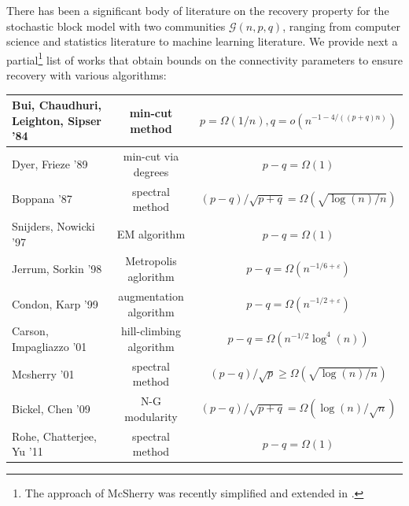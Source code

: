 \documentclass[english]{article}
\newcommand{\eps}{\varepsilon}
\newcommand{\1}{\textbf{1}}
\begin{document}
There has been a significant body of literature on the recovery property for the stochastic block model with two communities $\mathcal{G}(n,p,q)$, ranging from computer science and statistics literature to machine learning literature. We provide next a partial\footnote{The approach of McSherry was recently simplified and extended in \cite{Vu-arxiv}.} list of works that obtain bounds on the connectivity parameters to ensure recovery with various algorithms:
\begin{center}
  \begin{tabular}{| l |  c |c   | }
  \hline
\cite{bui} Bui, Chaudhuri, Leighton, Sipser '84  & min-cut method& $p = \Omega(1/n), q=o(n^{-1-4/((p+q)n)})$\\
  \hline
\cite{dyer} Dyer, Frieze '89  & min-cut via degrees & $p -q = \Omega(1)$\\
  \hline
\cite{boppana} Boppana '87  & spectral method & $(p -q)/\sqrt{p+q} = \Omega(\sqrt{\log(n)/n})$\\
  \hline
\cite{snij} Snijders, Nowicki '97  & EM algorithm & $p -q = \Omega(1)$\\
\hline
\cite{jerrum} Jerrum, Sorkin '98  &Metropolis aglorithm & $p -q= \Omega(n^{-1/6+\eps})$\\
   \hline
\cite{condon} Condon, Karp '99 & augmentation algorithm & $p -q= \Omega(n^{-1/2+\eps})$\\
  \hline
\cite{carson} Carson, Impagliazzo '01  & hill-climbing algorithm & $p-q= \Omega(n^{-1/2} \log^4(n))$\\
 \hline
\cite{mcsherry} Mcsherry '01  & spectral method & $(p - q)/\sqrt{p} \geq \Omega (\sqrt{\log(n)/n })$\\
 \hline
\cite{bickel} Bickel, Chen '09  & N-G modularity & $(p -q)/\sqrt{p+q} = \Omega(\log(n)/\sqrt{n})$\\
 \hline
\cite{rohe} Rohe, Chatterjee, Yu '11  & spectral method & $p -q= \Omega(1)$\\
  \hline
  \end{tabular}
\end{center}
\end{document}
